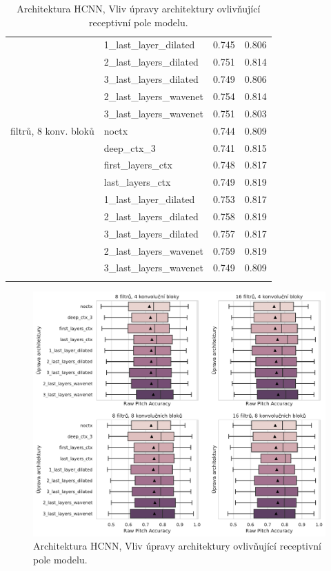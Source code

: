 \begin{table}[h]
\begin{tabular}{llrr}
{} & 1\_last\_layer\_dilated & 0.745 & 0.806 \\
{} & 2\_last\_layers\_dilated & 0.751 & 0.814 \\
{} & 3\_last\_layers\_dilated & 0.749 & 0.806 \\
{} & 2\_last\_layers\_wavenet & 0.754 & 0.814 \\
{} & 3\_last\_layers\_wavenet & 0.751 & 0.803 \\
\arrayrulecolor{black!30}\midrule
16 filtrů, 8 konv. bloků & noctx & 0.744 & 0.809 \\
{} & deep\_ctx\_3 & 0.741 & 0.815 \\
{} & first\_layers\_ctx & 0.748 & 0.817 \\
{} & last\_layers\_ctx & 0.749 & 0.819 \\
{} & 1\_last\_layer\_dilated & 0.753 & 0.817 \\
{} & 2\_last\_layers\_dilated & 0.758 & 0.819 \\
{} & 3\_last\_layers\_dilated & 0.757 & 0.817 \\
{} & 2\_last\_layers\_wavenet & 0.759 & 0.819 \\
{} & 3\_last\_layers\_wavenet & 0.749 & 0.809 \\
\arrayrulecolor{black}\bottomrule
    \end{tabular}
\caption{Architektura HCNN, Vliv úpravy architektury ovlivňující receptivní pole modelu.}\label{tab:spectrogram_ctx_archs}
\end{table}

\begin{figure}[h]\centering
    \includegraphics[width=\textwidth,height=\textheight,keepaspectratio]{../img/figures/spectrogram_ctx_archs}
\caption{Architektura HCNN, Vliv úpravy architektury ovlivňující receptivní pole modelu.}\label{obr:spectrogram_ctx_archs}
\end{figure}

